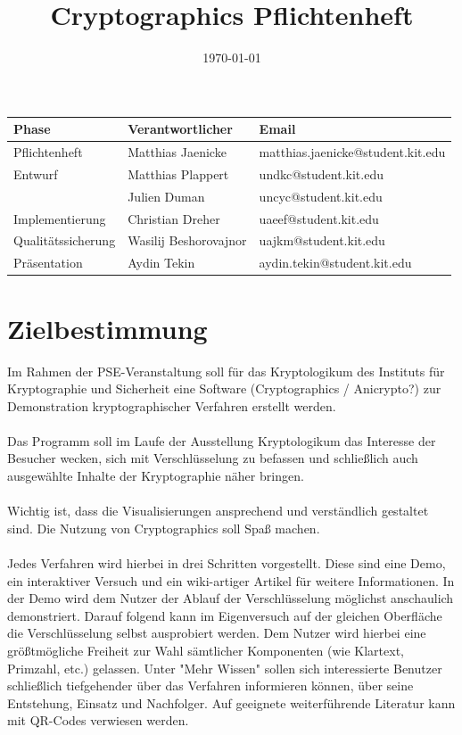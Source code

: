 \documentclass{article}
\title{Cryptographics Pflichtenheft}
\author{}
\date{\today}
\begin{document}
\maketitle
\begin{center}
  \begin{tabular}{| l | l | l |}
    \hline
    Phase & Verantwortlicher & Email \\ \hline
    Pflichtenheft & Matthias Jaenicke & matthias.jaenicke@student.kit.edu \\ \hline
    Entwurf & Matthias Plappert & undkc@student.kit.edu \\
            & Julien Duman & uncyc@student.kit.edu \\ \hline
    Implementierung & Christian Dreher & uaeef@student.kit.edu \\ \hline
    Qualitätssicherung & Wasilij Beshorovajnor & uajkm@student.kit.edu \\ \hline
    Präsentation & Aydin Tekin & aydin.tekin@student.kit.edu \\ \hline
    \end{tabular}
\end{center}
\newpage

\tableofcontents
\newpage

\section{Zielbestimmung}


Im Rahmen der PSE-Veranstaltung soll für das Kryptologikum des Instituts für 
Kryptographie und Sicherheit eine Software (Cryptographics / Anicrypto?) zur 
Demonstration kryptographischer Verfahren erstellt werden. \\
\\
Das Programm soll im Laufe der Ausstellung Kryptologikum das Interesse der Besucher wecken, sich mit Verschlüsselung zu befassen und schließlich auch ausgewählte Inhalte der Kryptographie näher bringen. \\
\\
Wichtig ist, dass die Visualisierungen ansprechend und verständlich gestaltet sind. Die Nutzung von Cryptographics soll Spaß machen. \\
\\
Jedes Verfahren wird hierbei in drei Schritten vorgestellt. Diese sind eine Demo, ein interaktiver Versuch und ein wiki-artiger Artikel für weitere Informationen.
In der Demo wird dem Nutzer der Ablauf der Verschlüsselung möglichst anschaulich demonstriert. Darauf folgend kann im Eigenversuch auf der gleichen Oberfläche die Verschlüsselung selbst ausprobiert werden. Dem Nutzer wird hierbei eine größtmögliche Freiheit zur Wahl sämtlicher Komponenten (wie Klartext, Primzahl, etc.) gelassen. Unter "Mehr Wissen" sollen sich interessierte Benutzer schließlich tiefgehender über das Verfahren informieren können, über seine Entstehung, Einsatz und Nachfolger. Auf geeignete weiterführende Literatur kann mit QR-Codes verwiesen werden. \\
\end{document}
